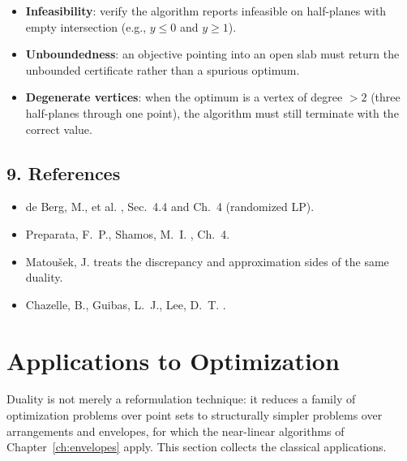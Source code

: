 \begin{itemize}
\item \textbf{Infeasibility}: verify the algorithm reports infeasible on
  half-planes with empty intersection (e.g., $y \le 0$ and $y \ge 1$).
\item \textbf{Unboundedness}: an objective pointing into an open slab must
  return the unbounded certificate rather than a spurious optimum.
\item \textbf{Degenerate vertices}: when the optimum is a vertex of degree
  $> 2$ (three half-planes through one point), the algorithm must still
  terminate with the correct value.
\end{itemize}

\subsection{9. References}

\begin{itemize}
\item de Berg, M., et al. \cite{deberg2008}, Sec.~4.4 and Ch.~4 (randomized
  LP).
\item Preparata, F.~P., Shamos, M.~I. \cite{preparata1985}, Ch.~4.
\item Matou\v{s}ek, J. \cite{matousek1999} treats the discrepancy and
  approximation sides of the same duality.
\item Chazelle, B., Guibas, L.~J., Lee, D.~T. \cite{chazelle1985power}.
\end{itemize}


\section{Applications to Optimization}
\label{sec:duality_optimization}

Duality is not merely a reformulation technique: it reduces a family of
optimization problems over point sets to structurally simpler problems over
arrangements and envelopes, for which the near-linear algorithms of
Chapter~\ref{ch:envelopes} apply. This section collects the classical
applications.

